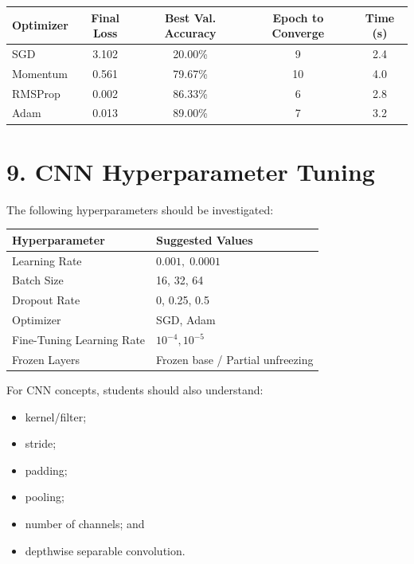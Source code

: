 \documentclass[10pt]{article}
\begin{document}
\begin{center}

\begin{tabular}{|l|c|c|c|c|}
\hline
Optimizer & Final Loss & Best Val. Accuracy & Epoch to Converge & Time (s)\\
\hline
SGD      & 3.102 & 20.00\% & 9  & 2.4\\
Momentum & 0.561 & 79.67\% & 10 & 4.0\\
RMSProp  & 0.002 & 86.33\% & 6  & 2.8\\
Adam     & 0.013 & 89.00\% & 7  & 3.2\\
\hline
\end{tabular}

\end{center}

\section*{9. CNN Hyperparameter Tuning}

The following hyperparameters should be investigated:

\begin{center}
\begin{tabular}{|l|l|}
\hline
Hyperparameter & Suggested Values\\
\hline
Learning Rate & $0.001,\;0.0001$\\
Batch Size & 16, 32, 64\\
Dropout Rate & 0, 0.25, 0.5\\
Optimizer & SGD, Adam\\
Fine-Tuning Learning Rate & $10^{-4},10^{-5}$\\
Frozen Layers & Frozen base / Partial unfreezing\\
\hline
\end{tabular}
\end{center}

For CNN concepts, students should also understand:

\begin{itemize}
\item kernel/filter;
\item stride;
\item padding;
\item pooling;
\item number of channels; and
\item depthwise separable convolution.
\end{itemize}
\end{document}
